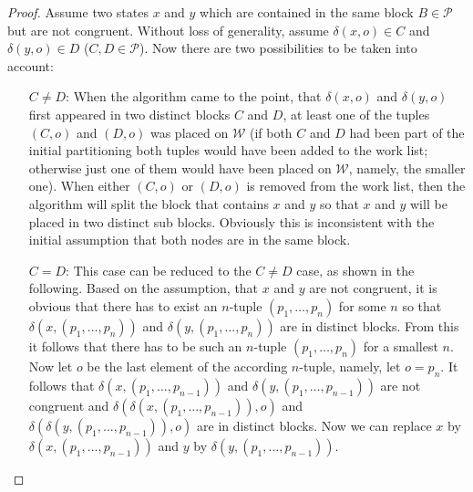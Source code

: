 \begin{proof}
Assume two states $x$ and $y$ which are contained in the same block $B \in \mathcal{P}$ but are not congruent. Without loss of generality, assume $\delta (x, o) \in C$ and $\delta(y, o) \in D$ ($C, D \in \mathcal{P}$). Now there are two possibilities to be taken into account:
\begin{itemize}
\item[$C \neq D$:] When the algorithm came to the point, that $\delta (x,o)$ and $\delta (y,o)$ first appeared in two distinct blocks $C$ and $D$,  at least one of the tuples $(C,o)$ and $(D,o)$ was placed on $\mathcal{W}$ (if both $C$ and $D$ had been part of the initial partitioning both tuples would have been added to the work list; otherwise just one of them would have been placed on $\mathcal{W}$, namely, the smaller one). When either $(C,o)$ or $(D,o)$ is removed from the work list, then the algorithm will split the block that contains $x$ and $y$ so that $x$ and $y$ will be placed in two distinct sub blocks. Obviously this is inconsistent with the initial assumption that both nodes are in the same block.
\item[$C = D$:] This case can be reduced to the $C \neq D$ case, as shown in the following. Based on the assumption, that $x$ and $y$ are not congruent, it is obvious that there has to exist an $n$-tuple $(p_1,\ldots ,p_n)$ for some $n$ so that $\delta (x,(p_1,\ldots ,p_n))$ and $\delta (y,(p_1,\ldots ,p_n))$ are in distinct blocks. From this it follows that there has to be such an $n$-tuple $(p_1,\ldots ,p_n)$ for a smallest $n$. Now let $o$ be the last element of the according $n$-tuple, namely, let $o = p_n$. It follows that $\delta (x,(p_1,\ldots ,p_{n-1}))$ and $\delta (y,(p_1,\ldots ,p_{n-1}))$ are not congruent and $\delta (\delta (x,(p_1,\ldots ,p_{n-1})), o)$ and $\delta (\delta (y,(p_1,\ldots ,p_{n-1})), o)$ are in distinct blocks. Now we can replace $x$ by $\delta (x,(p_1,\ldots ,p_{n-1}))$ and $y$ by $\delta (y,(p_1,\ldots ,p_{n-1}))$.
\end{itemize}
\end{proof}
